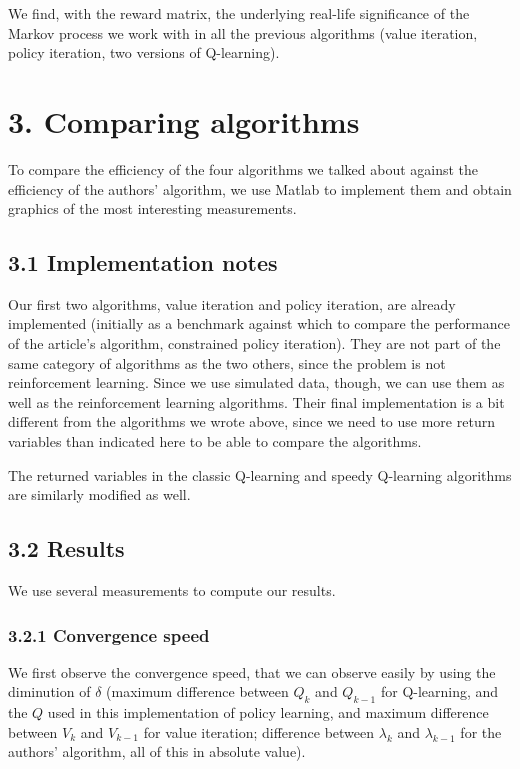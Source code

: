 \documentclass[a4paper, 12pt]{report}
\begin{document}
We find, with the reward matrix, the underlying real-life significance of the Markov process we work with in all the previous algorithms
(value iteration, policy iteration, two versions of Q-learning).

\chapter*{3. Comparing algorithms}

To compare the efficiency of the four algorithms we talked about against the efficiency of the authors' algorithm,
we use Matlab to implement them and obtain graphics of the most interesting measurements.

\section*{3.1 Implementation notes}

Our first two algorithms, value iteration and policy iteration, are already implemented
(initially as a benchmark against which to compare the performance of the article's algorithm, constrained policy iteration).
They are not part of the same category of algorithms as the two others, since the problem is not reinforcement learning.
Since we use simulated data, though, we can use them as well as the reinforcement learning algorithms.
Their final implementation is a bit different from the algorithms we wrote above, since we need to use more return variables than indicated here to be able to compare the algorithms.

The returned variables in the classic Q-learning and speedy Q-learning algorithms are similarly modified as well.

\section*{3.2 Results}

We use several measurements to compute our results.

\subsection*{3.2.1 Convergence speed}

We first observe the convergence speed, that we can observe easily by using the diminution of $\delta$
(maximum difference between $Q_k$ and $Q_{k-1}$ for Q-learning, and the $Q$ used in this implementation of policy learning,
and maximum difference between $V_k$ and $V_{k-1}$ for value iteration; difference between $\lambda_k$ and $\lambda_{k-1}$ for the authors' algorithm, all of this in absolute value).
\end{document}
